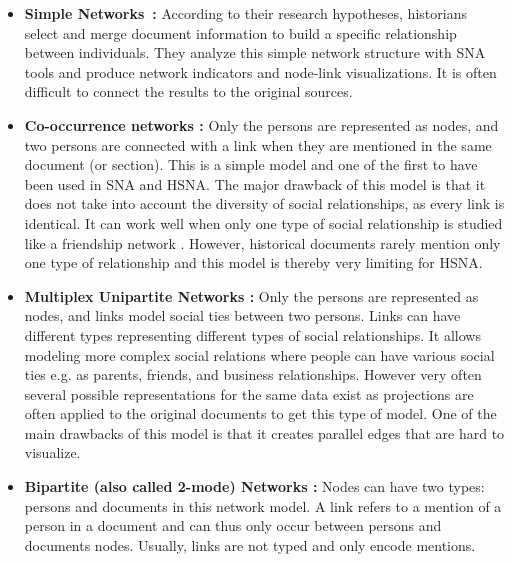 \begin{itemize}[nosep,leftmargin=*]
    \item \textbf{Simple Networks~\cite{wetherellHistoricalSocialNetwork1998}:} According to their research hypotheses, historians select and merge document information to build a specific relationship between individuals. They analyze this simple network structure with SNA tools and produce network indicators and node-link visualizations. It is often difficult to connect the results to the original sources.
    \item \textbf{Co-occurrence networks \cite{sairioMethodologicalPracticalAspects2009}:}
    Only the persons are represented as nodes, and two persons are connected with a link when they are mentioned in the same document (or section).
    This is a simple model and one of the first to have been used in SNA and HSNA. The major drawback of this model is that it does not take into account the diversity of social relationships, as every link is identical. It can work well when only one type of social relationship is studied like a friendship network \cite{morenoFoundationsSociometryIntroduction1941}. However, historical documents rarely mention only one type of relationship and this model is thereby very limiting for HSNA.
    \item \textbf{Multiplex Unipartite Networks \cite{eriksonMalfeasanceFoundationsGlobal2006}:} Only the persons are represented as nodes, and links model social ties between two persons. Links can have different types representing different types of social relationships. It allows modeling more complex social relations where people can have various social ties e.g. as parents, friends, and business relationships. However very often several possible representations for the same data exist as projections are often applied to the original documents to get this type of model. One of the main drawbacks of this model is that it creates parallel edges that are hard to visualize.
    \item \textbf{Bipartite (also called 2-mode) Networks
    \cite{hambergerScanningPatternsRelationship2014}
    :} Nodes can have two types: persons and documents in this network model. A link refers to a mention of a person in a document and can thus only occur between persons and documents nodes. Usually, links are not typed and only encode mentions.

\end{itemize}
